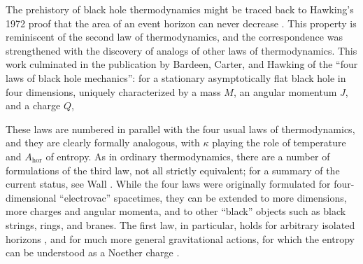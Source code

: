 \documentclass[12pt]{article}
\begin{document}
The prehistory of black hole thermodynamics might be traced back to Hawking's
1972 proof that the area of an event horizon can never decrease \cite{Hawkingb}.
This property is reminiscent of the second law of thermodynamics, and the 
correspondence was strengthened with the discovery of analogs of other 
laws of thermodynamics.  This work culminated in the publication
by Bardeen, Carter, and Hawking \cite{BCH}  of the ``four laws of black hole
mechanics'': for a stationary asymptotically flat black hole in four dimensions, 
uniquely characterized by a mass $M$, an angular momentum $J$, and a 
charge $Q$,
\begin{center}
\end{center}

These laws are numbered in parallel with the four usual laws of thermodynamics,
and they are clearly formally analogous, with $\kappa$ playing the role 
of temperature and $A_{\mathrm{\scriptstyle hor}}$ of entropy.  
As in ordinary thermodynamics, 
there are a number of formulations of the third law, not all strictly 
equivalent; for a summary of the current status, see Wall \cite{Wall}.  
While the four laws were originally formulated for four-dimensional 
``electrovac'' spacetimes, they can be extended to more dimensions, 
more charges and angular momenta, and to other ``black'' objects
such as black strings, rings, and branes.  The first law, in particular, 
holds for arbitrary isolated horizons \cite{Ashisol}, and for much 
more general gravitational actions, for which the entropy can be 
understood as a Noether charge \cite{Wald_Noether}.
\end{document}
